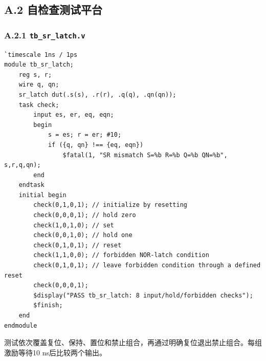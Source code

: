 \documentclass[12pt,a4paper]{ctexart}
\begin{document}
\subsection*{A.2 自检查测试平台}
\subsubsection*{A.2.1 \texttt{tb\_sr\_latch.v}}
\begin{lstlisting}
`timescale 1ns / 1ps
module tb_sr_latch;
    reg s, r;
    wire q, qn;
    sr_latch dut(.s(s), .r(r), .q(q), .qn(qn));
    task check;
        input es, er, eq, eqn;
        begin
            s = es; r = er; #10;
            if ({q, qn} !== {eq, eqn})
                $fatal(1, "SR mismatch S=%b R=%b Q=%b QN=%b", s,r,q,qn);
        end
    endtask
    initial begin
        check(0,1,0,1); // initialize by resetting
        check(0,0,0,1); // hold zero
        check(1,0,1,0); // set
        check(0,0,1,0); // hold one
        check(0,1,0,1); // reset
        check(1,1,0,0); // forbidden NOR-latch condition
        check(0,1,0,1); // leave forbidden condition through a defined reset
        check(0,0,0,1);
        $display("PASS tb_sr_latch: 8 input/hold/forbidden checks");
        $finish;
    end
endmodule
\end{lstlisting}
测试依次覆盖复位、保持、置位和禁止组合，再通过明确复位退出禁止组合。每组激励等待10 ns后比较两个输出。
\end{document}
